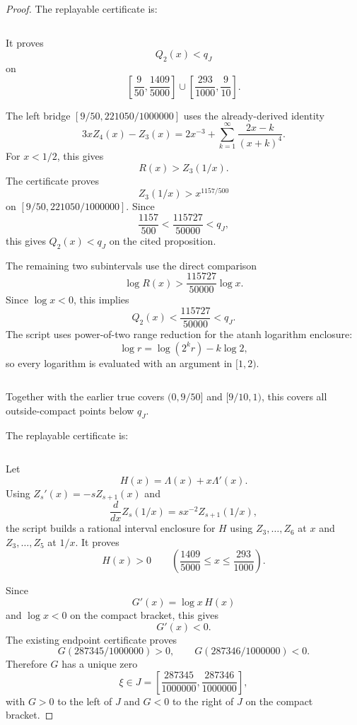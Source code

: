 \documentclass[11pt]{article}
\numberwithin{equation}{section}
\theoremstyle{definition}
\theoremstyle{remark}
\newcommand{\1}{\mathbf 1}
\begin{document}
\begin{proof}
The replayable certificate is:

\begin{verbatim}
\end{verbatim}

It proves
\[
Q_2(x)<q_J
\]
on
\[
\left[\frac9{50},\frac{1409}{5000}\right]
\cup
\left[\frac{293}{1000},\frac9{10}\right].
\]

The left bridge \([9/50,221050/1000000]\) uses the already-derived identity
\[
3xZ_4(x)-Z_3(x)
=2x^{-3}+\sum_{k=1}^{\infty}\frac{2x-k}{(x+k)^4}.
\]
For \(x<1/2\), this gives
\[
R(x)>Z_3(1/x).
\]
The certificate proves
\[
Z_3(1/x)>x^{1157/500}
\]
on \([9/50,221050/1000000]\). Since
\[
\frac{1157}{500}<\frac{115727}{50000}<q_J,
\]
this gives \(Q_2(x)<q_J\) on the cited proposition.

The remaining two subintervals use the direct comparison
\[
\log R(x)>\frac{115727}{50000}\log x.
\]
Since \(\log x<0\), this implies
\[
Q_2(x)<\frac{115727}{50000}<q_J.
\]
The script uses power-of-two range reduction for the atanh logarithm enclosure:
\[
\log r=\log(2^k r)-k\log 2,
\]
so every logarithm is evaluated with an argument in \([1,2)\).


\begin{verbatim}
\end{verbatim}

Together with the earlier true covers \((0,9/50]\) and \([9/10,1)\), this covers all outside-compact points below \(q_J\).



The replayable certificate is:

\begin{verbatim}
\end{verbatim}

Let
\[
H(x)=\Lambda(x)+x\Lambda'(x).
\]
Using \(Z_s'(x)=-sZ_{s+1}(x)\) and
\[
\frac{d}{dx}Z_s(1/x)=s x^{-2} Z_{s+1}(1/x),
\]
the script builds a rational interval enclosure for \(H\) using \(Z_3,\ldots,Z_6\) at \(x\) and \(Z_3,\ldots,Z_5\) at \(1/x\). It proves
\[
H(x)>0
\qquad
\left(\frac{1409}{5000}\le x\le\frac{293}{1000}\right).
\]

Since
\[
G'(x)=\log x\,H(x)
\]
and \(\log x<0\) on the compact bracket, this gives
\[
G'(x)<0.
\]
The existing endpoint certificate proves
\[
G(287345/1000000)>0,
\qquad
G(287346/1000000)<0.
\]
Therefore \(G\) has a unique zero
\[
\xi\in J=\left[\frac{287345}{1000000},\frac{287346}{1000000}\right],
\]
with \(G>0\) to the left of \(J\) and \(G<0\) to the right of \(J\) on the compact bracket.


\end{proof}
\end{document}
